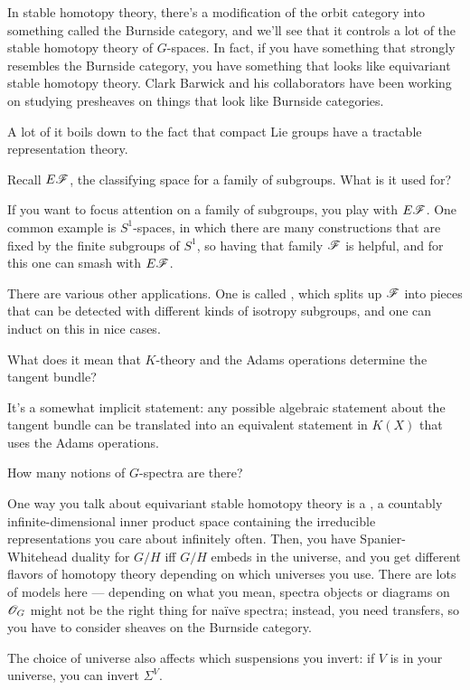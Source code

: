 In stable homotopy theory, there's a modification of the orbit category into something called the Burnside
category, and we'll see that it controls a lot of the stable homotopy theory of $G$-spaces. In fact, if you have
something that strongly resembles the Burnside category, you have something that looks like equivariant stable
homotopy theory. Clark Barwick and his collaborators have been working on studying presheaves on things that look
like Burnside categories.

A lot of it boils down to the fact that compact Lie groups have a tractable representation theory.
\begin{ques}
Recall $E\mathscr F$, the classifying space for a family of subgroups. What is it used for?
\end{ques}
If you want to focus attention on a family of subgroups, you play with $E\mathscr F$. One common example is $S^1$-spaces,
in which there are many constructions that are fixed by the finite subgroups of $S^1$, so having that family $\mathscr F$
is helpful, and for this one can smash with $E\mathscr F$.

There are various other applications. One is called , which splits up $\mathscr F$ into pieces
that can be detected with different kinds of isotropy subgroups, and one can induct on this in nice cases.
\begin{ques}
What does it mean that $K$-theory and the Adams operations determine the tangent bundle?
\end{ques}
It's a somewhat implicit statement: any possible algebraic statement about the tangent bundle can be translated
into an equivalent statement in $K(X)$ that uses the Adams operations.
\begin{ques}
How many notions of $G$-spectra are there?
\end{ques}
One way you talk about equivariant stable homotopy theory is a , a countably infinite-dimensional
inner product space containing the irreducible representations you care about infinitely often. Then, you have
Spanier-Whitehead duality for $G/H$ iff $G/H$ embeds in the universe, and you get different flavors of homotopy
theory depending on which universes you use. There are lots of models here --- depending on what you mean, spectra
objects or diagrams on $\mathscr O_G$ might not be the right thing for naïve spectra; instead, you need transfers, so you
have to consider sheaves on the Burnside category.

The choice of universe also affects which suspensions you invert: if $V$ is in your universe, you can invert
$\Sigma^V$.

